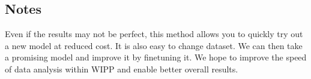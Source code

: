 

\subsection{Notes}

Even if the results may not be perfect, this method allows you to quickly try
out a new model at reduced cost. It is also easy to change dataset. We can then
take a promising model and improve it by finetuning it. We hope to improve the
speed of data analysis within \Gls{WIPP} and enable better overall results.
